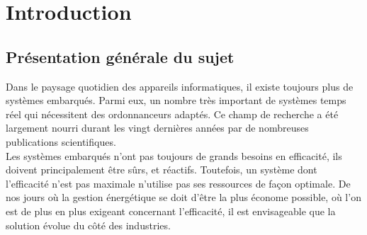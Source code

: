 \documentclass[11pt,a4paper,oneside]{report}
\begin{document}
%


\thispagestyle{empty} 
\setcounter{page}{0}
\tableofcontents




\chapter{Introduction}{}
\setcounter{page}{1}


\section{Présentation générale du sujet}

Dans le paysage quotidien des appareils informatiques, il existe toujours plus de systèmes embarqués. 
Parmi eux, un nombre très important de systèmes temps réel qui nécessitent des 
ordonnanceurs adaptés. Ce champ de recherche a été largement nourri durant les 
vingt dernières années par de nombreuses publications scientifiques. \\

Les systèmes embarqués n'ont pas toujours de grands besoins en efficacité, 
ils doivent principalement être sûrs, et réactifs. 
Toutefois, un système dont l'efficacité n'est pas maximale n'utilise pas ses ressources 
de façon optimale. 
De nos jours où la gestion énergétique se doit d'être la plus économe possible, 
où l'on est de plus en plus exigeant concernant l'efficacité, il est envisageable que 
la solution évolue du côté des industries.\\
\end{document}
